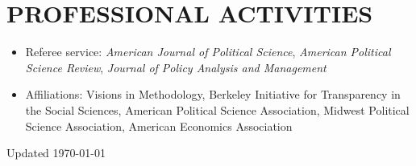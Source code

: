 \documentclass[10pt]{article}
\begin{document}
\vspace{3mm}
\section*{PROFESSIONAL ACTIVITIES}


\begin{itemize}	

\item[]Referee service: \textit{American Journal of Political Science}, \textit{American Political Science Review}, \textit{Journal of Policy Analysis and Management}
\item[]Affiliations: Visions in Methodology, Berkeley Initiative for Transparency in the Social Sciences, American Political Science Association, Midwest Political Science Association, American Economics Association
\end{itemize}









\vspace*{\fill}

Updated \today
\end{document}
